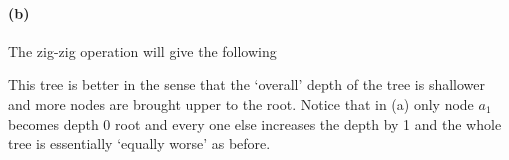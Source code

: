 \documentclass[10pt,letter]{article}
\begin{document}
\paragraph{(b)} The zig-zig operation will give the following 


This tree is better in the sense that the `overall' depth of the tree is shallower and more nodes are brought upper to the root. Notice that in (a) only node $a_1$ becomes depth 0 root and every one else increases the depth by 1 and the whole tree is essentially `equally worse' as before.

\pagebreak
\end{document}
